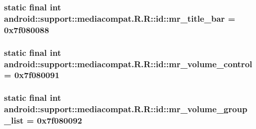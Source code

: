 \hypertarget{classandroid_1_1support_1_1mediacompat_1_1_r_1_1id_a1adbaff394dedae6354d525e3246ac9}{
\subsubsection[{mr\_\-title\_\-bar}]{\setlength{\rightskip}{0pt plus 5cm}static final int android::support::mediacompat.R.R::id::mr\_\-title\_\-bar = 0x7f080088}}
\label{classandroid_1_1support_1_1mediacompat_1_1_r_1_1id_a1adbaff394dedae6354d525e3246ac9}


\hypertarget{classandroid_1_1support_1_1mediacompat_1_1_r_1_1id_29bcb34eea9702c796e87ac0e7b7ca17}{
\subsubsection[{mr\_\-volume\_\-control}]{\setlength{\rightskip}{0pt plus 5cm}static final int android::support::mediacompat.R.R::id::mr\_\-volume\_\-control = 0x7f080091}}
\label{classandroid_1_1support_1_1mediacompat_1_1_r_1_1id_29bcb34eea9702c796e87ac0e7b7ca17}


\hypertarget{classandroid_1_1support_1_1mediacompat_1_1_r_1_1id_1469d610ea2d9f897bf1ca2dc9902b0d}{
\subsubsection[{mr\_\-volume\_\-group\_\-list}]{\setlength{\rightskip}{0pt plus 5cm}static final int android::support::mediacompat.R.R::id::mr\_\-volume\_\-group\_\-list = 0x7f080092}}
\label{classandroid_1_1support_1_1mediacompat_1_1_r_1_1id_1469d610ea2d9f897bf1ca2dc9902b0d}


